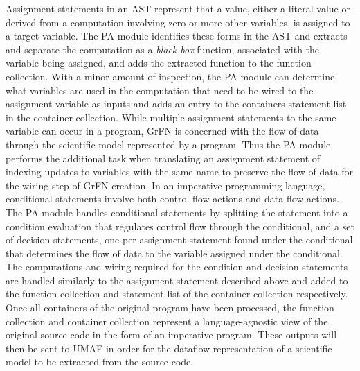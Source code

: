 Assignment statements in an AST represent that a value, either a literal value or derived from a computation involving zero or more other variables, is assigned to a target variable.
The PA module identifies these forms in the AST and extracts and separate the computation as a \textit{black-box} function, associated with the variable being assigned, and adds the extracted function to the function collection.
With a minor amount of inspection, the PA module can determine what variables are used in the computation that need to be wired to the assignment variable as inputs and adds an entry to the containers statement list in the container collection.
While multiple assignment statements to the same variable can occur in a program, GrFN is concerned with the flow of data through the scientific model represented by a program.
Thus the PA module performs the additional task when translating an assignment statement of indexing updates to variables with the same name to preserve the flow of data for the wiring step of GrFN creation.
In an imperative programming language, conditional statements involve both control-flow actions and data-flow actions.
The PA module handles conditional statements by splitting the statement into a condition evaluation that regulates control flow through the conditional, and a set of decision statements, one per assignment statement found under the conditional that determines the flow of data to the variable assigned under the conditional.
The computations and wiring required for the condition and decision statements are handled similarly to the assignment statement described above and added to the function collection and statement list of the container collection respectively.
Once all containers of the original program have been processed, the function collection and container collection represent a language-agnostic view of the original source code in the form of an imperative program.
These outputs will then be sent to UMAF in order for the dataflow representation of a scientific model to be extracted from the source code.

